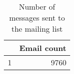 \begin{table}[ht]
\begin{center}
\begin{tabular}{rr}
  \hline
 & Email count \\ 
  \hline
1 & 9760 \\ 
   \hline
\end{tabular}
\caption{Number of messages sent to the mailing list}
\end{center}
\end{table}
